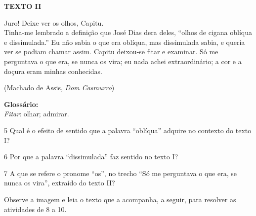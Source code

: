 \begin{myquote}
\begin{center}
\textbf{TEXTO II}
\end{center}

\noindent Juro! Deixe ver os olhos, Capitu.\\
Tinha-me lembrado a definição que José Dias dera deles, ``olhos de cigana
oblíqua e dissimulada.'' Eu não sabia o que era oblíqua, mas dissimulada
sabia, e queria ver se podiam chamar assim. Capitu deixou-se fitar e
examinar. Só me perguntava o que era, se nunca os vira; eu nada achei
extraordinário; a cor e a doçura eram minhas conhecidas.
\medskip

\begin{flushright}
(Machado de Assis, \emph{Dom Casmurro})
\end{flushright}

\noindent\textbf{Glossário:}\\
\textit{Fitar}: olhar; admirar.

\end{myquote}




\num{5} Qual é o efeito de sentido que a palavra ``oblíqua'' adquire no
contexto do texto I?


\num{6} Por que a palavra ``dissimulada'' faz sentido no texto I?


\num{7} A que se refere o pronome ``os'', no trecho ``Só me perguntava o
que era, se nunca os vira'', extraído do texto II?


\pagebreak
Observe a imagem e leia o texto que a acompanha, a seguir, para
resolver as atividades de 8 a 10.


